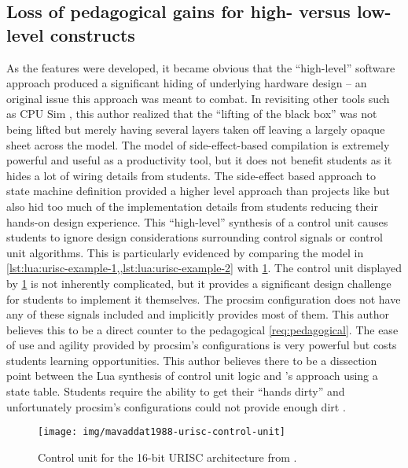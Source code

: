 \subsection{Loss of pedagogical gains for high- versus low-level constructs}

As the features were developed, it became obvious that the ``high-level'' software approach produced a significant hiding of underlying hardware design -- an original issue this approach was meant to combat. In revisiting other tools such as CPU Sim \cite{Skrien2001}, this author realized that the ``lifting of the black box'' was not being lifted but merely having several layers taken off leaving a largely opaque sheet across the model. The model of side-effect-based compilation is extremely powerful and useful as a productivity tool, but it does not benefit students as it hides a lot of wiring details from students. The side-effect based approach to state machine definition provided a higher level approach than projects like \cite{Black2013} but also hid too much of the implementation details from students reducing their hands-on design experience. This ``high-level'' synthesis of a control unit causes students to ignore design considerations surrounding control signals or control unit algorithms. This is particularly evidenced by comparing the model in \cref{lst:lua:urisc-example-1,,lst:lua:urisc-example-2} with \cref{fig:mavaddat1988-urisc-control-unit}. The control unit displayed by \cref{fig:mavaddat1988-urisc-control-unit} is not inherently complicated, but it provides a significant design challenge for students to implement it themselves. The procsim configuration does not have any of these signals included and implicitly provides most of them. This author believes this to be a direct counter to the pedagogical \cref{req:pedagogical}. The ease of use and agility provided by procsim's configurations is very powerful but costs students learning opportunities. This author believes there to be a dissection point between the Lua synthesis of control unit logic and \cite{Black2013}'s approach using a state table. Students require the ability to get their ``hands dirty'' and unfortunately procsim's configurations could not provide enough dirt \cite{Skrien2001,Garcia2009,Ackovska2014,Black2013}.

\begin{figure}[hb!]
    \centering
    \texttt{[image: img/mavaddat1988-urisc-control-unit]}
    \caption{Control unit for the 16-bit URISC architecture from \cite[p.~331]{Mavaddat1988}.}
    \label{fig:mavaddat1988-urisc-control-unit}
\end{figure}

